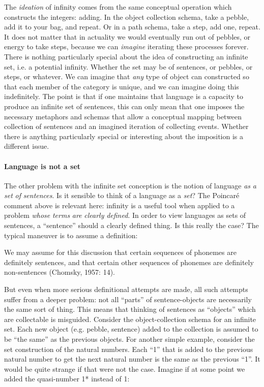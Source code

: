   The \textit{ideation} of infinity comes from the same conceptual operation which constructs the integers: adding. In the object collection schema, take a pebble, add it to your bag, and repeat. Or in a path schema, take a step, add one, repeat. It does not matter that in actuality we would eventually run out of pebbles, or energy to take steps, because we can \textit{imagine} iterating these processes forever. There is nothing particularly special about the idea of constructing an infinite set, i.e. a potential infinity. Whether the set may be of sentences, or pebbles, or steps, or whatever. We can imagine that \textit{any} type of object can constructed so that each member of the category is unique, and we can imagine doing this indefinitely. The point is that if one maintains that language is a capacity to produce an infinite set of sentences, this can only mean that one imposes the necessary metaphors and schemas that allow a conceptual mapping between collection of sentences and an imagined iteration of collecting events. Whether there is anything particularly special or interesting about the imposition is a different issue.

\paragraph{Language is not a set}

The other problem with the infinite set conception is the notion of language \textit{as} \textit{a} \textit{set} \textit{of} \textit{sentences}. Is it sensible to think of a language as a \textit{set}? The Poincaré comment above is relevant here: infinity is a useful tool when applied to a problem \textit{whose} \textit{terms} \textit{are} \textit{clearly} \textit{defined}. In order to view languages as sets of sentences, a “sentence” should a clearly defined thing. Is this really the case? The typical maneuver is to assume a definition:

We may assume for this discussion that certain sequences of phonemes are definitely sentences, and that certain other sequences of phonemes are definitely non-sentences (Chomsky, 1957: 14).

  But even when more serious definitional attempts are made, all such attempts suffer from a deeper problem: not all “parts” of sentence-objects are necessarily the same sort of thing. This means that thinking of sentences as “objects” which are collectable is misguided. Consider the object-collection schema for an infinite set. Each new object (e.g. pebble, sentence) added to the collection is assumed to be “the same” as the previous objects. For another simple example, consider the set construction of the natural numbers. Each “1” that is added to the previous natural number to get the next natural number is the same as the previous “1”. It would be quite strange if that were not the case. Imagine if at some point we added the quasi-number 1* instead of 1:

